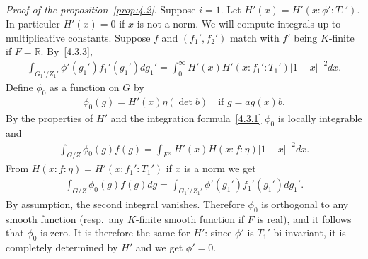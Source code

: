 \subsection{}
\emph{Proof of the proposition\ \ref{prop:4.2}}.
Suppose $i = 1$.
Let $H'(x) = H'(x:\phi':T_1')$.
In particuler $H'(x) = 0$ if $x$ is not a norm.
We will compute integrals up to multiplicative constants.
Suppose $f$ and $(f_1', f_2')$ match with $f'$ being $K$-finite if $F = \mathbb{R}$.
By~\eqref{4.3.3},
\begin{align*}
    \int_{G_1' / Z_1'} \phi'(g_1') f_1'(g_1') dg_1' = \int_{0}^{\infty} H'(x) H'(x:f_1':T_1') |1 - x|^{-2} dx.
\end{align*}
Define $\phi_0$ as a function on $G$ by
\begin{align*}
    \phi_0(g) = H'(x) \eta(\det b) \quad \text{if } g = ag(x) b.
\end{align*}
By the properties of $H'$ and the integration formula~\eqref{4.3.1} $\phi_0$ is locally integrable and
\begin{align*}
    \int_{G/Z} \phi_0(g) f(g) = \int_{F^\times} H'(x) H(x:f:\eta) |1 - x|^{-2} dx.
\end{align*}
From $H(x:f:\eta) = H'(x:f_1':T_1')$ if $x$ is a norm we get
\begin{align*}
    \int_{G/Z} \phi_0(g) f(g) dg = \int_{G_1' / Z_1'} \phi'(g_1') f_1'(g_1') dg_1'.
\end{align*}
By assumption, the second integral vanishes.
Therefore $\phi_0$ is orthogonal to any smooth function (resp.\ any $K$-finite smooth function if $F$ is real), and it  follows that $\phi_0$ is zero.
It is therefore the same for $H'$: since $\phi'$ is $T_1'$ bi-invariant, it is completely determined by $H'$ and we get $\phi' = 0$.